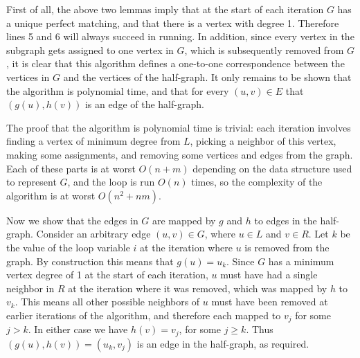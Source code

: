 \documentclass{hmcpset}
\begin{document}
\begin{solution}
\begin{enumerate}
First of all, the above two lemmas imply that at the start of each iteration
$G$ has a unique perfect matching, and that there is a vertex with degree 1.
Therefore lines 5 and 6 will always succeed in running.
In addition, since every vertex in the subgraph gets assigned to one vertex in $G$,
which is subsequently removed from $G$,
it is clear that this algorithm defines a one-to-one correspondence
between the vertices in $G$ and the vertices of the half-graph.
It only remains to be shown that the algorithm is polynomial time, and that
for every $(u, v) \in E$ that $(g(u), h(v))$ is an edge of the half-graph.

The proof that the algorithm is polynomial time is trivial: each iteration
involves finding a vertex of minimum degree from $L$, picking a neighbor
of this vertex, making some assignments, and removing some vertices and
edges from the graph. Each of these parts is at worst $O(n + m)$ depending on
the data structure used to represent $G$, and the loop is run $O(n)$ times,
so the complexity of the algorithm is at worst $O(n^2 + nm)$.

Now we show that the edges in $G$ are mapped by $g$ and $h$ to edges
in the half-graph. Consider an arbitrary edge
$(u, v) \in G$, where $u \in L$ and
$v \in R$. Let $k$ be the value of the loop variable $i$ at the iteration
where $u$ is removed from the graph. By construction this means that
$g(u) = u_k$.
Since $G$ has a minimum vertex degree of 1 at the start of each iteration,
$u$ must have had a single neighbor in $R$ at the iteration where it was
removed, which was mapped by $h$ to $v_k$.
This means all other possible neighbors of $u$ must have
been removed at earlier iterations of the algorithm, and therefore each
mapped to $v_j$ for some $j > k$. In either case we have $h(v) = v_j$,
for some $j \ge k$. Thus $(g(u), h(v)) = (u_k, v_j)$ is an edge
in the half-graph, as required.

\end{enumerate}
\end{solution}
\end{document}
